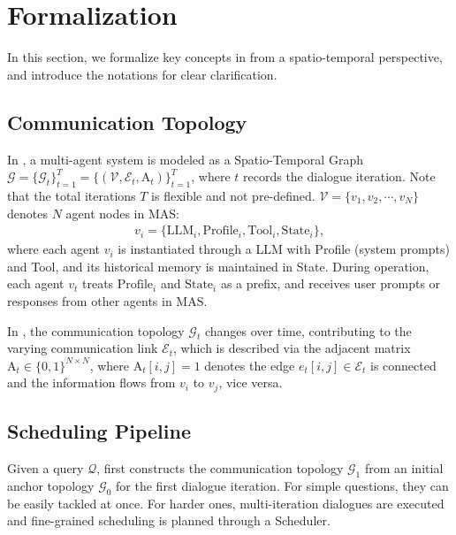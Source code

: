 \section{Formalization}
\label{sec: formalization}
In this section, we formalize key concepts in \ourmethod from a spatio-temporal perspective, and introduce the notations for clear clarification.
\subsection{Communication Topology}
In \ourmethod, a multi-agent system is modeled as a Spatio-Temporal Graph $\mathcal{G} = \{\mathcal{G}_t\}_{t=1}^T=\{(\mathcal{V}, \mathcal{E}_t,\mathrm{A}_t)\}_{t=1}^T$, where $t$ records the dialogue iteration. Note that the total iterations $T$ is flexible and not pre-defined. $\mathcal{V} = \{v_1, v_2, \cdots, v_N\}$ denotes $N$ agent nodes in MAS:
\begin{gather}
    v_i = \{\text{LLM}_i, \text{Profile}_i, \text{Tool}_i, \text{State}_i \},\label{eq1}
\end{gather}
where each agent $v_i$ is instantiated through a LLM with Profile (system prompts) and Tool, and its historical memory is maintained in State. During operation, each agent $v_t$ treats $\text{Profile}_i$ and $\text{State}_i$ as a prefix, and receives user prompts or responses from other agents in MAS.

In \ourmethod, the communication topology $\mathcal{G}_t$ changes over time, contributing to the varying communication link $\mathcal{E}_t$, which is described via the adjacent matrix $\mathrm{A}_t\in \{0,1\}^{N\times N}$, where $\mathrm{A}_t[i,j]=1$ denotes the edge $e_t[i,j] \in \mathcal{E}_t$ is connected and the information flows from $v_i$ to $v_j$, vice versa.

\subsection{Scheduling Pipeline}

Given a query $\mathcal{Q}$, \ourmethod first constructs the communication topology $\mathcal{G}_1$ from an initial anchor topology $\mathcal{G}_0$ for the first dialogue iteration. For simple questions, they can be easily tackled at once. For harder ones, multi-iteration dialogues are executed and fine-grained scheduling is planned through a Scheduler.  

